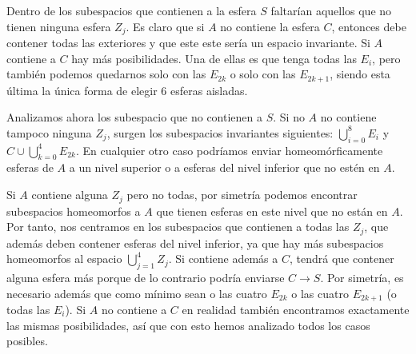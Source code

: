 \documentclass[twoside]{article}
\begin{document}
\begin{solucion}
 Dentro de los subespacios que contienen a la esfera $S$ faltarían aquellos que no tienen ninguna esfera $Z_j$. Es claro que si $A$ no contiene la esfera $C$, entonces debe contener todas las exteriores y que este este sería un espacio invariante. Si $A$ contiene a $C$ hay más posibilidades. Una de ellas es que tenga todas las $E_i$, pero también podemos quedarnos solo con las $E_{2k}$ o solo con las $E_{2k+1}$, siendo esta última la única forma de elegir 6 esferas aisladas. 
 
 Analizamos ahora los subespacio que no contienen a $S$. Si no $A$ no contiene tampoco ninguna $Z_j$, surgen los subespacios invariantes siguientes: $\bigcup_{i=0}^8E_i$ y $C\cup \bigcup_{k=0}^4E_{2k}$. En cualquier otro caso podríamos enviar homeomórficamente esferas de $A$ a un nivel superior o a esferas del nivel inferior que no estén en $A$. 

 
 Si $A$ contiene alguna $Z_j$ pero no todas, por simetría podemos encontrar subespacios homeomorfos a $A$ que tienen esferas en este nivel que no están en $A$. Por tanto, nos centramos en los subespacios que contienen a todas las $Z_j$, que además deben contener esferas del nivel inferior, ya que hay más subespacios homeomorfos al espacio $\bigcup_{j=1}^4Z_j$. Si contiene además a $C$, tendrá que contener alguna esfera más porque de lo contrario podría enviarse $C\to S$. Por simetría, es necesario además que como mínimo sean o las cuatro $E_{2k}$ o las cuatro $E_{2k+1}$ (o todas las $E_i$). Si $A$ no contiene a $C$ en realidad también encontramos exactamente las mismas posibilidades, así que con esto hemos analizado todos los casos posibles. 
 

 
\end{solucion}
\end{document}
